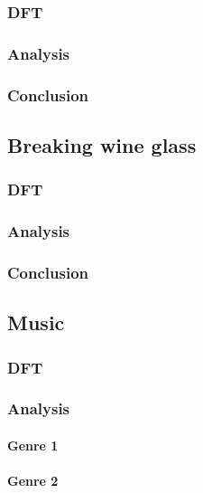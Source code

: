 \subsubsection{DFT}

\subsubsection{Analysis}

\subsubsection{Conclusion}

\subsection{Breaking wine glass}
\subsubsection{DFT}

\subsubsection{Analysis}

\subsubsection{Conclusion}

\subsection{Music}
\subsubsection{DFT}

\subsubsection{Analysis}

\paragraph{Genre 1}

\paragraph{Genre 2}

